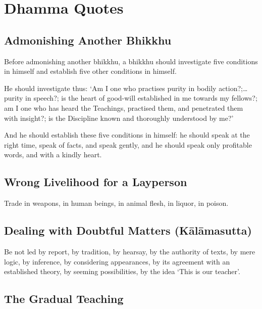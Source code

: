 \chapter{Dhamma Quotes}

\section*{Admonishing Another Bhikkhu}

Before admonishing another bhikkhu, a bhikkhu should investigate five conditions
in himself and establish five other conditions in himself.

He should investigate thus: ‘Am I one who practises purity in bodily action?;…
purity in speech?; is the heart of good-will established in me towards my
fellows?; am I one who has heard the Teachings, practised them, and penetrated
them with insight?; is the Discipline known and thoroughly understood by me?’

And he should establish these five conditions in himself: he should speak at the
right time, speak of facts, and speak gently, and he should speak only
profitable words, and with a kindly heart.


\section*{Wrong Livelihood for a Layperson}

Trade in weapons, in human beings, in animal flesh, in liquor, in poison.


\ifhandbookedition
\vspace*{-\baselineskip}
\fi

\section*{Dealing with Doubtful Matters (Kālāmasutta)}

Be not led by report, by tradition, by hearsay, by the authority of texts, by
mere logic, by inference, by considering appearances, by its agreement with an
established theory, by seeming possibilities, by the idea ‘This is our teacher’.


\ifhandbookedition
\vspace*{-\baselineskip}
\fi

\section*{The Gradual Teaching}

